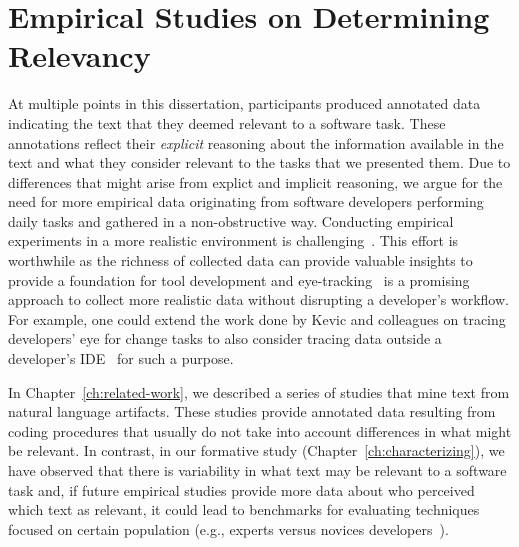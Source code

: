 






\section{Empirical Studies on Determining Relevancy}
\label{cp7:empirical-studies}





At multiple points in this dissertation, participants produced annotated data 
indicating the text that they deemed relevant to a software task. 
These annotations reflect their \textit{explicit} reasoning about the information 
available in the text and what they consider relevant to the tasks 
that we presented them. 
Due to differences that might arise from explict and implicit reasoning,
 we argue for the need for more empirical data 
originating from
software developers performing daily tasks
and gathered in a non-obstructive way.
Conducting empirical
 experiments in a more realistic environment is challenging~\cite{Kevic2015}.
This effort is worthwhile as
the richness of collected data can provide valuable insights
to provide a foundation for tool development
and eye-tracking~\cite{Cutrell2007, Petrusel2013, sharafi2020}
is a promising approach to collect more realistic data without disrupting a developer's workflow.
For example, one could
extend the work done by Kevic and colleagues on
tracing developers' eye for change tasks to
also consider tracing data outside a developer's IDE~\cite{Kevic2015}
for such a purpose.


In Chapter~\ref{ch:related-work}, we described 
a series of studies that mine text from natural language artifacts.
These studies provide annotated data 
resulting from coding procedures that usually do not take into account
differences in what might be relevant. 
In contrast, in our formative study (Chapter~\ref{ch:characterizing}),
we have observed that there is variability in what text may be relevant 
to a software task and, if future empirical studies
provide more data about who perceived which text as relevant, it could lead to benchmarks 
for evaluating techniques
focused on certain population  (e.g., experts versus novices developers~\cite{Crosby1990, Busjahn2015}). 







